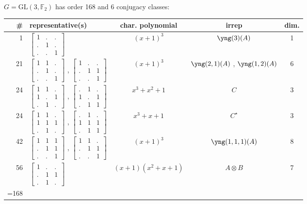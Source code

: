 \documentclass[11pt,oneside]{article}
\newcommand{\GL}{\mathrm{GL}}
\newcommand{\Field}{\mathbb{F}}
\newcommand{\tensor}{\otimes}
\begin{document}
$G=\GL(3,\Field_2)$ has order 168 and 6 conjugacy classes:
\begin{center}
\begin{tabular}{r|l|c|c|c}
\# & representative(s) & char. polynomial & irrep & dim. \\
\hline
 1 & $\begin{bmatrix}1&.&.\\.&1&.\\.&.&1\end{bmatrix}$ & $(x+1)^3$  
    & $\yng(3)(A)$ & 1 \\
21 & $\begin{bmatrix}1&1&.\\.&1&.\\.&.&1\end{bmatrix}$ ,
     $\begin{bmatrix}1&.&.\\.&1&1\\.&.&1\end{bmatrix}$ & $(x+1)^3$  
    & $\yng(2,1)(A)$ , $\yng(1,2)(A)$ & 6  \\
24 & 
$\begin{bmatrix}1&1&.\\1&.&1\\.&1&.\end{bmatrix}$
,
$\begin{bmatrix}.&1&.\\1&.&1\\.&1&1\end{bmatrix}$
& $x^3+x^2+1$      & $C$ & 3 \\
24 & 
$\begin{bmatrix}1&1&.\\1&1&1\\.&1&.\end{bmatrix}$
,
$\begin{bmatrix}.&1&.\\1&1&1\\.&1&1\end{bmatrix}$
& $x^3+x+1$        & $C^{\star}$ & 3 \\
42 & $\begin{bmatrix}1&1&1\\.&1&1\\.&.&1\end{bmatrix}$
    ,  $\begin{bmatrix}1&1&.\\.&1&1\\.&.&1\end{bmatrix}$
    & $(x+1)^3$ 
    & $\yng(1,1,1)(A)$ & 8  \\
56 & $\begin{bmatrix}1&.&.\\.&1&1\\.&1&.\end{bmatrix}$ & $(x+1)(x^2+x+1)$
    & $A\tensor B$ & 7 \\
\hline
\strut =168 \\
\end{tabular}
\end{center}
\end{document}

